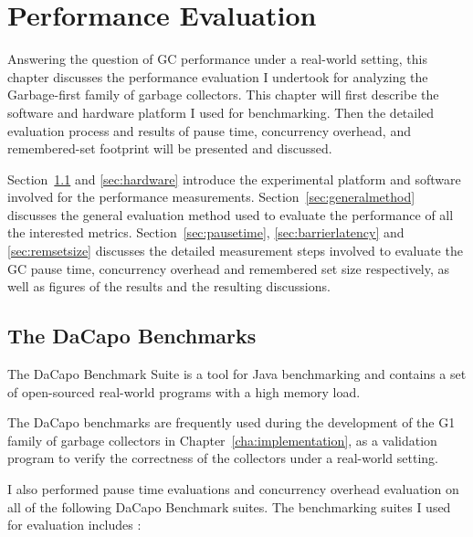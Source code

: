 \chapter{Performance Evaluation}
\label{cha:evaluation}

Answering the question of GC performance under a real-world setting,
this chapter discusses the performance evaluation I undertook for analyzing
the Garbage-first family of garbage collectors.
This chapter will first describe the software and hardware platform I used for benchmarking.
Then the detailed evaluation process and results of pause time,
concurrency overhead, and remembered-set footprint will be presented and discussed.

Section~\ref{sec:dacapo} and \ref{sec:hardware} introduce the experimental
platform and software involved for the performance measurements.
Section~\ref{sec:generalmethod} discusses the general evaluation method used to
evaluate the performance of all the interested metrics.
Section~\ref{sec:pausetime}, \ref{sec:barrierlatency} and \ref{sec:remsetsize} discusses the detailed
measurement steps involved to evaluate the GC pause time, concurrency overhead and remembered set size
respectively, as well
as figures of the results and the resulting discussions.

\section{The DaCapo Benchmarks} %
\label{sec:dacapo}

The DaCapo Benchmark Suite is a tool for Java benchmarking and contains a set of
open-sourced real-world programs with a high memory load.

The DaCapo benchmarks are frequently used during the development of the G1 family
of garbage collectors in Chapter~\ref{cha:implementation}, as a validation program
to verify the correctness of the collectors under a real-world setting.

I also performed pause time evaluations and concurrency overhead evaluation
on all of the following DaCapo Benchmark suites.
The benchmarking suites I used for evaluation includes \citep{Blackburn:2006:DBJ:1167515.1167488}:

